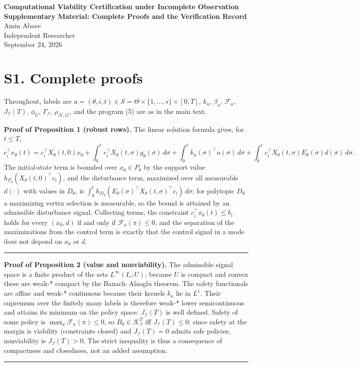\documentclass[10pt,article]{article}
\newcommand{\rulebar}{\begin{center}\rule{0.5\linewidth}{0.5pt}\end{center}}
\begin{document}
\begin{center}
{\Large\bfseries Computational Viability Certification under Incomplete Observation}\\[0.4em]
{\large\bfseries Supplementary Material: Complete Proofs and the Verification Record}\\[0.6em]
Amin Abaee\\
{\small Independent Researcher}\\
{\small September 24, 2026}
\end{center}

\section*{S1. Complete proofs}

Throughout, labels are \(a = (\theta, i, t) \in \mathscr S = \Theta \times
\{1,\dots,s\} \times [0,T]\), \(k_a\), \(\beta_a\), \(\mathcal F_a\),
\(J_{\mathcal I}(T)\), \(\phi_U\), \(\Gamma_{\mathcal I}\),
\(\rho_{\mathcal H,G}\), and the program (5) are as in the main text.

\textbf{Proof of Proposition 1 (robust rows).} The linear solution formula
gives, for \(t \le T\),
\[
c_i^\top x_\theta(t) = c_i^\top X_\theta(t,0)x_0 + \int_0^t c_i^\top
X_\theta(t,\sigma) g_\theta(\sigma)\,d\sigma + \int_0^t k_a(\sigma)^\top
u(\sigma)\, d\sigma + \int_0^t c_i^\top X_\theta(t,\sigma)E_\theta(\sigma)
d(\sigma)\, d\sigma .
\]
The initial-state term is bounded over \(x_0 \in P_\theta\) by the support
value \(h_{P_\theta}(X_\theta(t,0)^\top c_i)\), and the disturbance term,
maximized over all measurable \(d(\cdot)\) with values in \(D_\theta\), is
\(\int_0^t h_{D_\theta}(E_\theta(\sigma)^\top X_\theta(t,\sigma)^\top
c_i)\, d\sigma\); for polytopic \(D_\theta\) a maximizing vertex selection is
measurable, so the bound is attained by an admissible disturbance signal.
Collecting terms, the constraint \(c_i^\top x_\theta(t) \le b_i\) holds for
every \((x_0, d)\) if and only if \(\mathcal F_a(\pi) \le 0\), and the
separation of the maximizations from the control term is exactly that the
control signal in a mode does not depend on \(x_0\) or \(d\).
\rulebar

\textbf{Proof of Proposition 2 (value and nonviability).} The admissible
signal space is a finite product of the sets \(L^\infty(I_r; U)\); because
\(U\) is compact and convex these are weak-* compact by the Banach--Alaoglu
theorem. The safety functionals are affine and weak-* continuous because
their kernels \(k_a\) lie in \(L^1\). Their supremum over the finitely many
labels is therefore weak-* lower semicontinuous and attains its minimum on
the policy space: \(J_{\mathcal I}(T)\) is well defined. Safety of some
policy is \(\max_a \mathcal F_a(\pi) \le 0\), so \(B_0 \in
\mathcal K_{\mathcal I}^T\) iff \(J_{\mathcal I}(T) \le 0\); since safety at
the margin is viability (constraints closed) and \(J_{\mathcal I}(T) = 0\)
admits safe policies, nonviability is \(J_{\mathcal I}(T) > 0\). The strict
inequality is thus a consequence of compactness and closedness, not an added
assumption.
\rulebar
\end{document}
